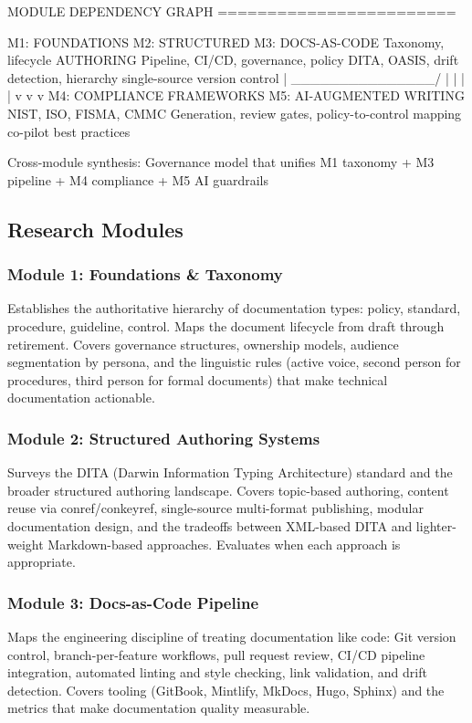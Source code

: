 \documentclass[11pt,letterpaper]{article}
\begin{document}
\begin{asciibox}
MODULE DEPENDENCY GRAPH
========================

  M1: FOUNDATIONS      M2: STRUCTURED       M3: DOCS-AS-CODE
  Taxonomy, lifecycle  AUTHORING            Pipeline, CI/CD,
  governance, policy   DITA, OASIS,         drift detection,
  hierarchy            single-source        version control
       |    \_______________/                     |
       |          |                               |
       v          v                               v
  M4: COMPLIANCE FRAMEWORKS         M5: AI-AUGMENTED WRITING
  NIST, ISO, FISMA, CMMC            Generation, review gates,
  policy-to-control mapping         co-pilot best practices

  Cross-module synthesis: Governance model that unifies
  M1 taxonomy + M3 pipeline + M4 compliance + M5 AI guardrails
\end{asciibox}

\subsection{Research Modules}

\subsubsection{Module 1: Foundations \& Taxonomy}
Establishes the authoritative hierarchy of documentation types: policy, standard, procedure, guideline, control. Maps the document lifecycle from draft through retirement. Covers governance structures, ownership models, audience segmentation by persona, and the linguistic rules (active voice, second person for procedures, third person for formal documents) that make technical documentation actionable.

\subsubsection{Module 2: Structured Authoring Systems}
Surveys the DITA (Darwin Information Typing Architecture) standard and the broader structured authoring landscape. Covers topic-based authoring, content reuse via conref/conkeyref, single-source multi-format publishing, modular documentation design, and the tradeoffs between XML-based DITA and lighter-weight Markdown-based approaches. Evaluates when each approach is appropriate.

\subsubsection{Module 3: Docs-as-Code Pipeline}
Maps the engineering discipline of treating documentation like code: Git version control, branch-per-feature workflows, pull request review, CI/CD pipeline integration, automated linting and style checking, link validation, and drift detection. Covers tooling (GitBook, Mintlify, MkDocs, Hugo, Sphinx) and the metrics that make documentation quality measurable.
\end{document}
